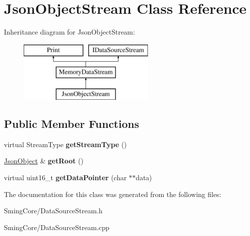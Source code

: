\hypertarget{class_json_object_stream}{}\section{Json\+Object\+Stream Class Reference}
\label{class_json_object_stream}
Inheritance diagram for Json\+Object\+Stream\+:\begin{figure}[H]
\begin{center}
\leavevmode
\includegraphics[height=3.000000cm]{class_json_object_stream}
\end{center}
\end{figure}
\subsection*{Public Member Functions}
\begin{DoxyCompactItemize}
\item 
\hypertarget{class_json_object_stream_abe3d3dc8206bb99ff332c25cf0cc0dfd}{}virtual Stream\+Type {\bfseries get\+Stream\+Type} ()\label{class_json_object_stream_abe3d3dc8206bb99ff332c25cf0cc0dfd}

\item 
\hypertarget{class_json_object_stream_a11a57e43ef18ff9937045f25cd74c607}{}\hyperlink{class_arduino_json_1_1_json_object}{Json\+Object} \& {\bfseries get\+Root} ()\label{class_json_object_stream_a11a57e43ef18ff9937045f25cd74c607}

\item 
\hypertarget{class_json_object_stream_ad559ca28b1f7138c8cac4292da1e67bf}{}virtual uint16\+\_\+t {\bfseries get\+Data\+Pointer} (char $\ast$$\ast$data)\label{class_json_object_stream_ad559ca28b1f7138c8cac4292da1e67bf}

\end{DoxyCompactItemize}


The documentation for this class was generated from the following files\+:\begin{DoxyCompactItemize}
\item 
Sming\+Core/Data\+Source\+Stream.\+h\item 
Sming\+Core/Data\+Source\+Stream.\+cpp\end{DoxyCompactItemize}
